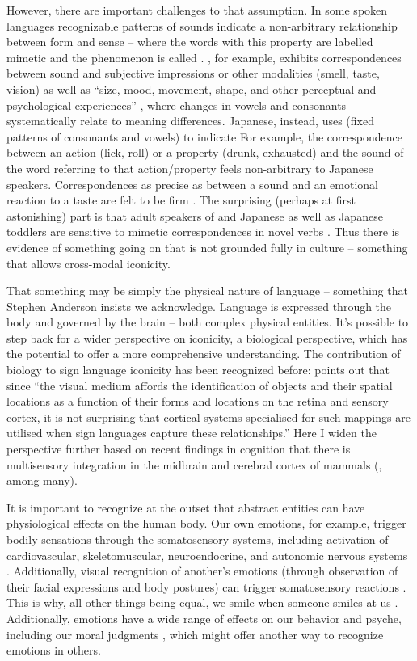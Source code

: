 \documentclass[output=paper,
modfonts
]{LSP/langsci}
\begin{document}
However, there are important challenges to that assumption. In some
spoken languages recognizable patterns of sounds indicate a
non-arbitrary relationship between form and sense -- where the words
with this property are labelled mimetic and the phenomenon is called
. , for example, exhibits correspondences between
sound and subjective impressions or other modalities (smell, taste,
vision) as well as ``size, mood, movement, shape, and other perceptual
and psychological experiences'' \citep[64]{cho2006}, where changes in vowels
and consonants systematically relate to meaning differences. Japanese,
instead, uses  (fixed patterns of consonants and vowels) to
indicate  \citep{hamano1998} For example, the correspondence between
an action (lick, roll) or a property (drunk, exhausted) and the sound of
the word referring to that action/property feels non-arbitrary to
Japanese speakers. Correspondences as precise as between a sound and an
emotional reaction to a taste are felt to be firm \citep{kagitani2014}. The surprising (perhaps at first astonishing) part is that adult
speakers of  and Japanese as well as Japanese toddlers are
sensitive to mimetic correspondences in novel verbs \citep{imai2008}.
Thus there is evidence of something going on that is not grounded fully
in culture -- something that allows cross-modal iconicity.

That something may be simply the physical nature of language --
something that Stephen Anderson insists we acknowledge. Language is
expressed through the body and governed by the brain -- both complex
physical entities. It's possible to step back for a wider perspective on
iconicity, a biological perspective, which has the potential to offer a
more comprehensive understanding. The contribution of biology to sign
language iconicity has been recognized before: \citet[150]{woll2009} points
out that since ``the visual medium affords the identification of objects
and their spatial locations as a function of their forms and locations
on the retina and sensory cortex, it is not surprising that cortical
systems specialised for such mappings are utilised when sign languages
capture these relationships.'' Here I widen the perspective further
based on recent findings in cognition that there is multisensory
integration in the midbrain and cerebral cortex of mammals (\citealt{stein2008}, among many).

It is important to recognize at the outset that abstract entities can
have physiological effects on the human body. Our own emotions, for
example, trigger bodily sensations through the somatosensory systems,
including activation of cardiovascular, skeletomuscular, neuroendocrine,
and autonomic nervous systems \citep{nummenmaa2014}. Additionally,
visual recognition of another's emotions (through observation of their
facial expressions and body postures) can trigger somatosensory
reactions \citep{rudrauf2009,sel2014}.
This is why, all other things being equal, we smile when someone smiles
at us \citep{niedenthal2007}. Additionally, emotions have a wide range of
effects on our behavior and psyche, including our moral judgments
\citep{charland2008}, which might offer another way to recognize
emotions in others.
\end{document}
